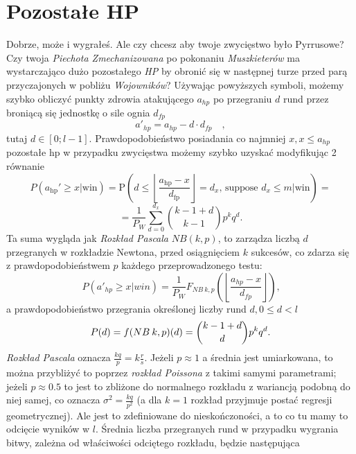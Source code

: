 \documentclass{article}
\begin{document}
\section{Pozostałe HP}
Dobrze, może i wygrałeś. Ale czy chcesz aby twoje zwycięstwo było Pyrrusowe? Czy twoja \emph{Piechota Zmechanizowana} po pokonaniu \emph{Muszkieterów} ma wystarczająco dużo pozostałego \emph{HP} by obronić się w następnej turze przed parą przyczajonych w pobliżu \emph{Wojowników}?
Używając powyższych symboli, możemy szybko obliczyć punkty zdrowia atakującego $a_{hp}$ po przegraniu $d$ rund przez broniącą się jednostkę o sile ognia $d_{fp}$
\begin{equation*}
    a'_{hp} = a_{hp} - d \cdot d_{fp}\quad,
\end{equation*}
tutaj $d \in [0;l-1]$. Prawdopodobieństwo posiadania co najmniej $x,x\leq a_{hp}$ pozostałe hp w przypadku zwycięstwa możemy szybko uzyskać modyfikując 2 równanie
\begin{equation*}
    P(a_\text{hp}'\ge x|\text{win}) = \mathrm P\left(d\le \left\lfloor \frac{a_\text{hp}-x}{d_\text{fp}}\right\rfloor=d_x\text{, suppose }d_x\le m|\text{win}\right)=
\end{equation*}
\begin{equation*}
    =\frac{1}{P_W}\sum_{d=0}^{d_x}{k - 1 + d \choose k-1} p^k q^d\text{.}
\end{equation*}
Ta suma wygląda jak \emph{Rozkład Pascala} $NB(k,p)$, to zarządza liczbą $d$ przegranych w rozkładzie Newtona, przed osiągnięciem $k$ sukcesów, co zdarza się z prawdopodobieństwem $p$ każdego przeprowadzonego testu:
\begin{equation*}
    P\left(a'_{hp} \geq x|win\right) = 
    \frac{1}{P_W}F_{NB\: k,p} \left(\left\lfloor
    \frac{a_{hp}-x}{d_{fp}}\right\rfloor\right)
    \text{,}
\end{equation*}
a prawdopodobieństwo przegrania określonej liczby rund $d,0\leq d < l$
\begin{equation*}
    P(d) = f(NB\: k,p)(d) = \dbinom{k-1+d}{d}p^{k}q^{d}
    \text{.}
\end{equation*}
\emph{Rozkład Pascala} oznacza $\frac{kq}{p}=k\frac{r}{s}$. Jeżeli $p\approx 1$ a średnia jest umiarkowana, to można przybliżyć to poprzez \emph{rozkład Poissona} z takimi samymi parametrami; jeżeli $p\approx 0.5$ to jest to zbliżone do normalnego rozkładu z wariancją podobną do niej samej, co oznacza $\sigma^2 = \frac{kq}{p^2}$ (a dla $k=1$ rozkład przyjmuje postać regresji geometrycznej). Ale jest to zdefiniowane do nieskończoności, a to co tu mamy to odcięcie wyników w $l$. Średnia liczba przegranych rund w przypadku wygrania bitwy, zależna od właściwości odciętego rozkładu, będzie następująca
\end{document}
